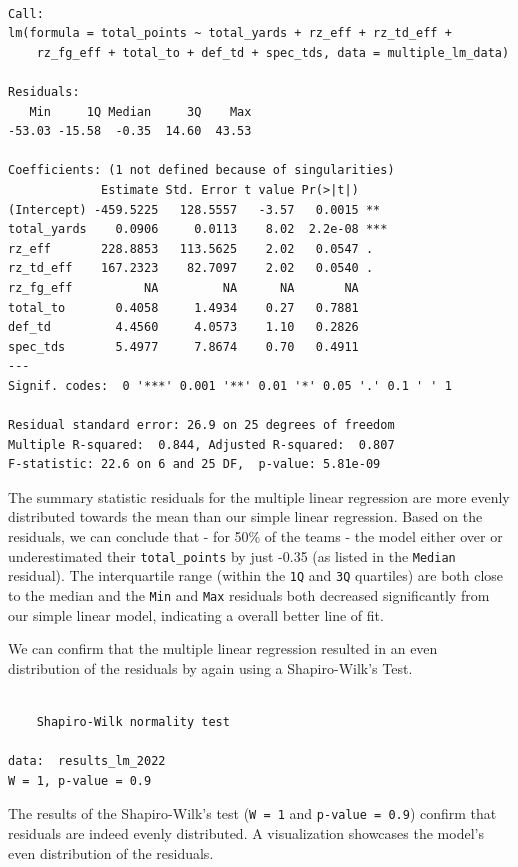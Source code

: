 \documentclass[
  letterpaper,
]{krantz}
\begin{document}
\begin{verbatim}

Call:
lm(formula = total_points ~ total_yards + rz_eff + rz_td_eff + 
    rz_fg_eff + total_to + def_td + spec_tds, data = multiple_lm_data)

Residuals:
   Min     1Q Median     3Q    Max 
-53.03 -15.58  -0.35  14.60  43.53 

Coefficients: (1 not defined because of singularities)
             Estimate Std. Error t value Pr(>|t|)    
(Intercept) -459.5225   128.5557   -3.57   0.0015 ** 
total_yards    0.0906     0.0113    8.02  2.2e-08 ***
rz_eff       228.8853   113.5625    2.02   0.0547 .  
rz_td_eff    167.2323    82.7097    2.02   0.0540 .  
rz_fg_eff          NA         NA      NA       NA    
total_to       0.4058     1.4934    0.27   0.7881    
def_td         4.4560     4.0573    1.10   0.2826    
spec_tds       5.4977     7.8674    0.70   0.4911    
---
Signif. codes:  0 '***' 0.001 '**' 0.01 '*' 0.05 '.' 0.1 ' ' 1

Residual standard error: 26.9 on 25 degrees of freedom
Multiple R-squared:  0.844, Adjusted R-squared:  0.807 
F-statistic: 22.6 on 6 and 25 DF,  p-value: 5.81e-09
\end{verbatim}

The summary statistic residuals for the multiple linear regression are
more evenly distributed towards the mean than our simple linear
regression. Based on the residuals, we can conclude that - for 50\% of
the teams - the model either over or underestimated their
\texttt{total\_points} by just -0.35 (as listed in the \texttt{Median}
residual). The interquartile range (within the \texttt{1Q} and
\texttt{3Q} quartiles) are both close to the median and the \texttt{Min}
and \texttt{Max} residuals both decreased significantly from our simple
linear model, indicating a overall better line of fit.

We can confirm that the multiple linear regression resulted in an even
distribution of the residuals by again using a Shapiro-Wilk's Test.

\begin{verbatim}

    Shapiro-Wilk normality test

data:  results_lm_2022
W = 1, p-value = 0.9
\end{verbatim}

The results of the Shapiro-Wilk's test (\texttt{W\ =\ 1} and
\texttt{p-value\ =\ 0.9}) confirm that residuals are indeed evenly
distributed. A visualization showcases the model's even distribution of
the residuals.
\end{document}
